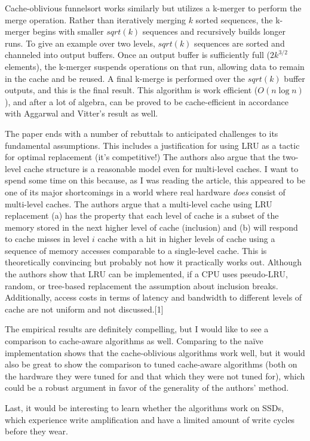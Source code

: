 Cache-oblivious funnelsort works similarly but utilizes a k-merger to perform the merge operation. Rather than iteratively merging $k$ sorted sequences, the k-merger begins with smaller $sqrt(k)$ sequences and recursively builds longer runs. To give an example over two levels, $sqrt(k)$ sequences are sorted and channeled into output buffers. Once an output buffer is sufficiently full ($2k^{3/2}$ elements), the k-merger suspends operations on that run, allowing data to remain in the cache and be reused. A final k-merge is performed over the $sqrt(k)$ buffer outputs, and this is the final result. This algorithm is work efficient ($O(n\log{n})$), and after a lot of algebra, can be proved to be cache-efficient in accordance with Aggarwal and Vitter's result as well.

The paper ends with a number of rebuttals to anticipated challenges to its fundamental assumptions. This includes a justification for using LRU as a tactic for optimal replacement (it's competitive!) The authors also argue that the two-level cache structure is a reasonable model even for multi-level caches. I want to spend some time on this because, as I was reading the article, this appeared to be one of its major shortcomings in a world where real hardware \textit{does} consist of multi-level caches. The authors argue that a multi-level cache using LRU replacement (a) has the property that each level of cache is a subset of the memory stored in the next higher level of cache (inclusion) and (b) will respond to cache misses in level $i$ cache with a hit in higher levels of cache using a sequence of memory accesses comparable to a single-level cache. This is theoretically convincing but probably not how it practically works out. Although the authors show that LRU can be implemented, if a CPU uses pseudo-LRU, random, or tree-based replacement the assumption about inclusion breaks. Additionally, access costs in terms of latency and bandwidth to different levels of cache are not uniform and not discussed.[1]

The empirical results are definitely compelling, but I would like to see a comparison to cache-aware algorithms as well. Comparing to the naïve implementation shows that the cache-oblivious algorithms work well, but it would also be great to show the comparison to tuned cache-aware algorithms (both on the hardware they were tuned for and that which they were not tuned for), which could be a robust argument in favor of the generality of the authors' method.

Last, it would be interesting to learn whether the algorithms work on SSDs, which experience write amplification and have a limited amount of write cycles before they wear.

